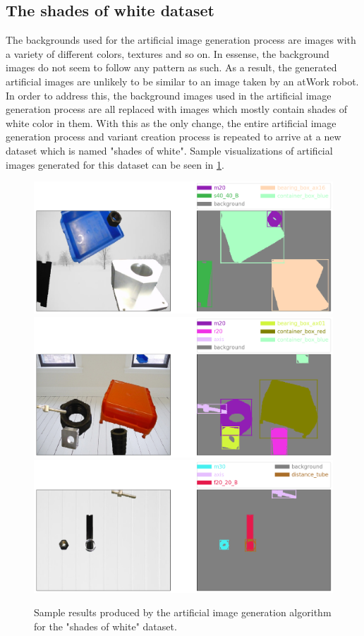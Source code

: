 	\subsection{The shades of white dataset}
The backgrounds used for the artificial image generation process are images with a variety of different colors, textures and so on. In essense, the background images do not seem to follow any pattern as such. As a result, the generated artificial images are unlikely to be similar to an image taken by an atWork robot. In order to address this, the background images used in the artificial image generation process are all replaced with images which mostly contain shades of white color in them. With this as the only change, the entire artificial image generation process and variant creation process is repeated to arrive at a new dataset which is named "shades of white". Sample visualizations of artificial images generated for this dataset can be seen in \ref{Fig:samplewhite}.

	\begin{figure}[htb!]
		\centering
		\includegraphics[scale=0.3]{images/sample_white_1}
		\includegraphics[scale=0.3]{images/sample_white_2}
		\includegraphics[scale=0.3]{images/sample_white_3}
		\caption{Sample results produced by the artificial image generation algorithm for the "shades of white" dataset.}
		\label{Fig:samplewhite}
	\end{figure}
	
